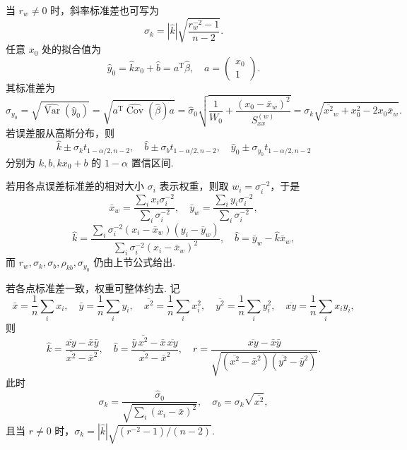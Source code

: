 当 \(r_w\neq0\) 时，斜率标准差也可写为
\begin{equation*}
	\sigma_k=|\hat{k}|\sqrt{\frac{r_w^{-2}-1}{n-2}}.
\end{equation*}
任意 \(x_0\) 处的拟合值为
\begin{equation*}
	\hat{y}_0=\hat{k}x_0+\hat{b}=a^\mathrm{T}\hat{\beta},
	\quad a=\begin{pmatrix}x_0\\1\end{pmatrix}.
\end{equation*}
其标准差为
\begin{equation*}
	\sigma_{y_0}=\sqrt{\widehat{\operatorname{Var}}(\hat{y}_0)}
	=\sqrt{a^\mathrm{T}\widehat{\operatorname{Cov}}(\hat{\beta})a}
	=\hat{\sigma}_0\sqrt{\frac{1}{W_0}+\frac{(x_0-\bar{x}_w)^2}{S_{xx}^{(w)}}}
	=\sigma_k\sqrt{\overline{x^2}_w+x_0^2-2x_0\bar{x}_w}.
\end{equation*}
若误差服从高斯分布，则
\begin{equation*}
	\hat{k}\pm\sigma_k t_{1-\alpha/2,n-2},
	\quad \hat{b}\pm\sigma_b t_{1-\alpha/2,n-2},
	\quad \hat{y}_0\pm\sigma_{y_0}t_{1-\alpha/2,n-2}
\end{equation*}
分别为 \(k,b,kx_0+b\) 的 \(1-\alpha\) 置信区间.

\begin{notes}

若用各点误差标准差的相对大小 \(\sigma_i\) 表示权重，则取 \(w_i=\sigma_i^{-2}\)，于是
\begin{equation*}
	\bar{x}_w=\frac{\sum_ix_i\sigma_i^{-2}}{\sum_i\sigma_i^{-2}},
	\quad \bar{y}_w=\frac{\sum_iy_i\sigma_i^{-2}}{\sum_i\sigma_i^{-2}},
\end{equation*}
\begin{equation*}
	\hat{k}=\frac{\sum_i\sigma_i^{-2}(x_i-\bar{x}_w)(y_i-\bar{y}_w)}
	{\sum_i\sigma_i^{-2}(x_i-\bar{x}_w)^2},
	\quad \hat{b}=\bar{y}_w-\hat{k}\bar{x}_w,
\end{equation*}
而 \(r_w,\sigma_k,\sigma_b,\rho_{kb},\sigma_{y_0}\) 仍由上节公式给出.

若各点标准差一致，权重可整体约去. 记
\begin{equation*}
	\bar{x}=\frac{1}{n}\sum_ix_i,
	\quad \bar{y}=\frac{1}{n}\sum_iy_i,
	\quad \overline{x^2}=\frac{1}{n}\sum_ix_i^2,
	\quad \overline{y^2}=\frac{1}{n}\sum_iy_i^2,
	\quad \overline{xy}=\frac{1}{n}\sum_ix_iy_i,
\end{equation*}
则
\begin{equation*}
	\hat{k}=\frac{\overline{xy}-\bar{x}\bar{y}}{\overline{x^2}-\bar{x}^2},
	\quad \hat{b}=\frac{\bar{y}\,\overline{x^2}-\bar{x}\,\overline{xy}}{\overline{x^2}-\bar{x}^2},\quad
	r=\frac{\overline{xy}-\bar{x}\bar{y}}
	{\sqrt{(\overline{x^2}-\bar{x}^2)(\overline{y^2}-\bar{y}^2)}}.
\end{equation*}
此时
\begin{equation*}
	\sigma_k=\frac{\hat{\sigma}_0}{\sqrt{\sum_i(x_i-\bar{x})^2}},
	\quad \sigma_b=\sigma_k\sqrt{\overline{x^2}},
\end{equation*}
且当 \(r\neq0\) 时，\(\sigma_k=|\hat{k}|\sqrt{(r^{-2}-1)/(n-2)}\).

\end{notes}
